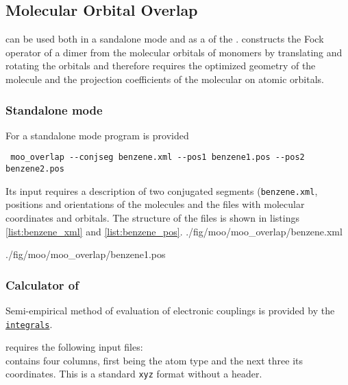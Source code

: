 \newcommand{\integrals}{\hyperref[calc:integrals]{\texttt{integrals}}\xspace}

\subsection{Molecular Orbital Overlap}

\moo can be used both in a sandalone mode and as a \calculator of the \votcact. \moo constructs the Fock operator of a dimer from the  molecular orbitals of monomers by translating and rotating the orbitals and therefore requires the optimized geometry of the molecule and the projection coefficients of the molecular on atomic orbitals. 


\subsubsection{Standalone mode}
For a standalone mode program \overlap is provided 
\begin{verbatim}
 moo_overlap --conjseg benzene.xml --pos1 benzene1.pos --pos2 benzene2.pos
\end{verbatim}
Its input requires a description of two conjugated segments (\texttt{benzene.xml}, positions and orientations of the molecules and the files with molecular coordinates and orbitals. The structure of the files is shown in listings \ref{list:benzene_xml} and  \ref{list:benzene_pos}.
\vskip 0.1cm
 {./fig/moo/moo_overlap/benzene.xml}

\vskip 0.1cm

 {./fig/moo/moo_overlap/benzene1.pos}


\subsubsection{Calculator of \votcact}
Semi-empirical method of evaluation of electronic couplings is provided by the \integrals \calculator.

\moo requires the following input files: \\
\noindent
\xyz contains four columns, first being the atom type and the next three its coordinates. This is a standard \texttt{xyz} format without a header. 
\vskip 0.1cm
\noindent

